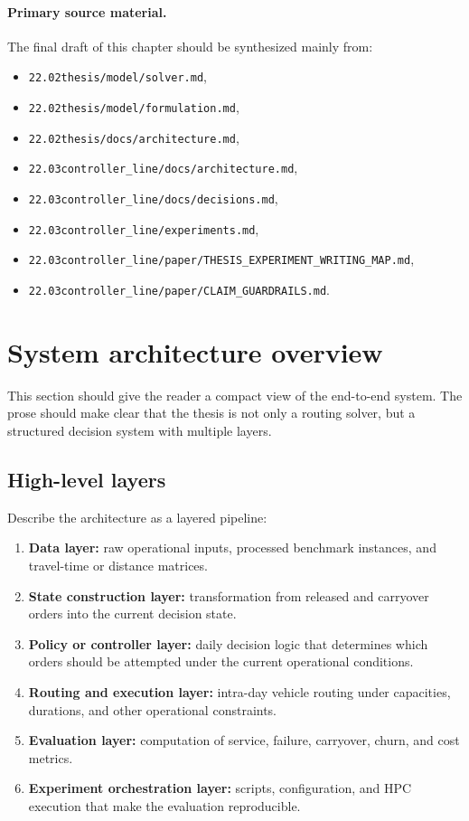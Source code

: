 \paragraph{Primary source material.}
The final draft of this chapter should be synthesized mainly from:
\begin{itemize}
    \item \texttt{22.02thesis/model/solver.md},
    \item \texttt{22.02thesis/model/formulation.md},
    \item \texttt{22.02thesis/docs/architecture.md},
    \item \texttt{22.03controller_line/docs/architecture.md},
    \item \texttt{22.03controller_line/docs/decisions.md},
    \item \texttt{22.03controller_line/experiments.md},
    \item \texttt{22.03controller_line/paper/THESIS\_EXPERIMENT\_WRITING\_MAP.md},
    \item \texttt{22.03controller_line/paper/CLAIM\_GUARDRAILS.md}.
\end{itemize}

\section{System architecture overview}
\label{sec:arch_overview}

This section should give the reader a compact view of the end-to-end system. The prose should make clear that the thesis is not only a routing solver, but a structured decision system with multiple layers.

\subsection{High-level layers}
\label{subsec:arch_layers}

Describe the architecture as a layered pipeline:
\begin{enumerate}
    \item \textbf{Data layer:} raw operational inputs, processed benchmark instances, and travel-time or distance matrices.
    \item \textbf{State construction layer:} transformation from released and carryover orders into the current decision state.
    \item \textbf{Policy or controller layer:} daily decision logic that determines which orders should be attempted under the current operational conditions.
    \item \textbf{Routing and execution layer:} intra-day vehicle routing under capacities, durations, and other operational constraints.
    \item \textbf{Evaluation layer:} computation of service, failure, carryover, churn, and cost metrics.
    \item \textbf{Experiment orchestration layer:} scripts, configuration, and HPC execution that make the evaluation reproducible.
\end{enumerate}

